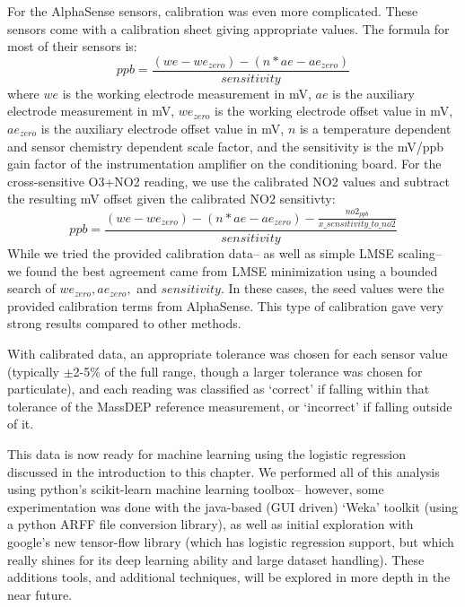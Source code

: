 For the AlphaSense sensors, calibration was even more complicated.  These sensors come with a calibration sheet giving appropriate values.  The formula for most of their sensors is: {\small \[ppb = \frac{(we - we_{zero}) - (n*ae - ae_{zero})}{sensitivity}\]} where $we$ is the working electrode measurement in mV, $ae$ is the auxiliary electrode measurement in mV, $we_{zero}$ is the working electrode offset value in mV, $ae_{zero}$ is the auxiliary electrode offset value in mV, $n$ is a temperature dependent and sensor chemistry dependent scale factor, and the sensitivity is the mV/ppb gain factor of the instrumentation amplifier on the conditioning board.  For the cross-sensitive O3+NO2 reading, we use the calibrated NO2 values and subtract the resulting mV offset given the calibrated NO2 sensitivty: {\small \[ppb = \frac{(we - we_{zero}) - (n*ae - ae_{zero}) - \frac{no2_{ppb}}{x\_sensitivity\_to\_no2}}{sensitivity}\]} While we tried the provided calibration data-- as well as simple LMSE scaling-- we found the best agreement came from LMSE minimization using a bounded search of $we_{zero},  ae_{zero},$ and $sensitivity$.  In these cases, the seed values were the provided calibration terms from AlphaSense.  This type of calibration gave very strong results compared to other methods.

With calibrated data, an appropriate tolerance was chosen for each sensor value (typically $\pm$2-5\% of the full range, though a larger tolerance was chosen for particulate), and each reading was classified as `correct' if falling within that tolerance of the MassDEP reference measurement, or `incorrect' if falling outside of it. 

This data is now ready for machine learning using the logistic regression discussed in the introduction to this chapter.  We performed all of this analysis using python's scikit-learn machine learning toolbox-- however, some experimentation was done with the java-based (GUI driven) `Weka' toolkit (using a python ARFF file conversion library), as well as initial exploration with google's new tensor-flow library (which has logistic regression support, but which really shines for its deep learning ability and large dataset handling).  These additions tools, and additional techniques, will be explored in more depth in the near future.

